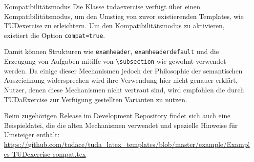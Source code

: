 \documentclass[
	ngerman,
	points=true,%
	]{tudaexercise}
\let\code\texttt
\let\cls\textsf
\let\tbs\textbackslash
\begin{document}
\begin{task}{Kompatibilitätsmodus}
Die Klasse \cls{tudaexercise} verfügt über einen Kompatibilitätsmodus, um den Umstieg von zuvor existierenden Templates, wie TUDexercise zu erleichtern.
Um den Kompatibilitätsmodus zu aktivieren, existiert die Option \code{compat=true}.

Damit können Strukturen wie \code{examheader}, \code{examheaderdefault} und die Erzeugung von Aufgaben mitilfe von \code{\tbs{}subsection} wie gewohnt verwendet werden. Da einige dieser Mechanismen jedoch der Philosophie der semantischen Auszeichnung widersprechen wird ihre Verwendung hier nicht genauer erklärt. Nutzer, denen diese Mechanismen nicht vertraut sind, wird empfohlen die durch TUDaExercise zur Verfügung gestellten Varianten zu nutzen.

Beim zugehörigen Release im Development Repository findet sich auch eine Beispieldatei, die die alten Mechanismen verwendet und spezielle Hinweise für Umsteiger enthält: \url{https://github.com/tudace/tuda_latex_templates/blob/master/example/Examples-TUDexercise-compat.tex}
\end{task}
\end{document}
